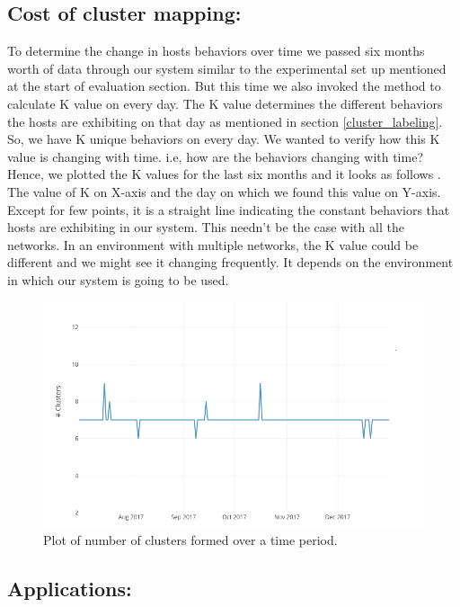 \subsection{Cost of cluster mapping:}

To determine the change in hosts behaviors over time we passed six months worth of data through our system similar to the experimental set up mentioned at the start of evaluation section. But this time we also invoked the method to calculate K value on every day. The K value determines the different behaviors the hosts are exhibiting on that day as mentioned in section \ref{cluster_labeling}. So, we have K unique behaviors on every day. We wanted to verify how this K value is changing with time. i.e, how are the behaviors changing with time? Hence, we plotted the K values for the last six months and it looks as follows . The value of K on X-axis and the day on which we found this value on Y-axis. Except for few points, it is a straight line indicating the constant behaviors that hosts are exhibiting in our system. This needn't be the case with all the networks. In an environment with multiple networks, the K value could be different and we might see it changing frequently. It depends on the environment in which our system is going to be used.

\begin{figure}[b]
	\centerline{\includegraphics{constant.png}}
	\caption{ Plot of number of clusters formed over a time period.}%
\end{figure}


\subsection{Applications:}

